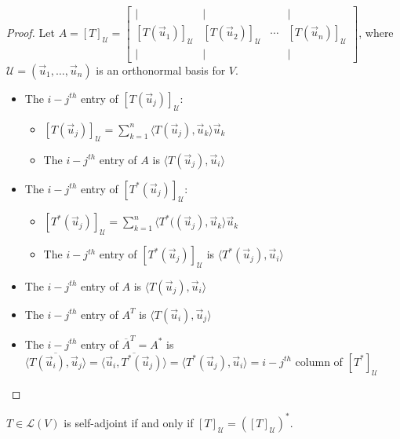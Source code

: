 \documentclass[11pt,fleqn]{book} %
\begin{document}
\begin{proof}
    Let $A = [T]_\mathcal{U} = \begin{bmatrix} | &| & &| \\ [T(\vec{u}_1)]_\mathcal{U} &[T(\vec{u}_2)]_\mathcal{U} & \cdots &[T(\vec{u}_n)]_\mathcal{U} \\ | &| & &|  \end{bmatrix}$, where $\mathcal{U} = (\vec{u}_1, \dots, \vec{u}_n)$ is an orthonormal basis for $V$.

    \begin{itemize}
        \item The $i-j^{th}$ entry of $[T(\vec{u}_j)]_\mathcal{U}$:

        \begin{itemize}
            \item $\displaystyle [T(\vec{u}_j)]_\mathcal{U} = \sum_{k=1}^n \langle T(\vec{u}_j), \vec{u}_k \rangle \vec{u}_k$
            \item The $i-j^{th}$ entry of $A$ is $\langle T(\vec{u}_j), \vec{u}_i \rangle$
        \end{itemize}

        \item The $i-j^{th}$ entry of $[T^*(\vec{u}_j)]_\mathcal{U}$:
        \begin{itemize}
            \item $\displaystyle [T^*(\vec{u}_j)]_\mathcal{U} = \sum_{k=1}^n \langle T^*((\vec{u}_j), \vec{u}_k \rangle \vec{u}_k$
            \item The $i-j^{th}$ entry of $[T^*(\vec{u}_j)]_\mathcal{U}$ is $\langle T^*(\vec{u}_j), \vec{u}_i \rangle$
        \end{itemize}

        \item The $i-j^{th}$ entry of $A$ is $\langle T(\vec{u}_j), \vec{u}_i \rangle$

        \item The $i-j^{th}$ entry of $A^T$ is $\langle T(\vec{u}_i), \vec{u}_j \rangle$

        \item The $i-j^{th}$ entry of $\overline{A}^T = A^*$ is $\overline {\langle T(\vec{u}_i), \vec{u}_j \rangle} = \overline{\langle \vec{u}_i, T^*(\vec{u}_j) \rangle} = \langle T^*(\vec{u}_j), \vec{u}_i \rangle = i-j^{th}$ column of $[T^*]_\mathcal{U}$
    \end{itemize}
\end{proof}

\setcounter{section}{0}
\setcounter{dummy}{8}
\begin{corollary}
    $T \in \mathcal{L}(V)$ is self-adjoint if and only if $[T]_\mathcal{U} = ([T]_\mathcal{U})^*$.
\end{corollary}
\end{document}
